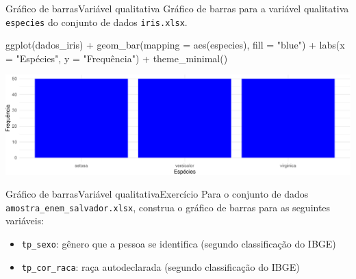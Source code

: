 \documentclass[
  10pt,
  ignorenonframetext,
]{beamer}
\newenvironment{Shaded}{}{}
\newcommand{\DataTypeTok}[1]{#1}
\newcommand{\KeywordTok}[1]{\textcolor[rgb]{0.00,0.00,1.00}{#1}}
\newcommand{\NormalTok}[1]{#1}
\newcommand{\OperatorTok}[1]{#1}
\newcommand{\StringTok}[1]{\textcolor[rgb]{0.00,0.50,0.50}{#1}}
\providecommand{\tightlist}{%
  \setlength{\itemsep}{0pt}\setlength{\parskip}{0pt}}
\begin{document}
\begin{frame}[fragile]{Gráfico de barras\newline Variável qualitativa}
\protect\hypertarget{gruxe1fico-de-barrasvariuxe1vel-qualitativa}{}
Gráfico de barras para a variável qualitativa \texttt{especies} do
conjunto de dados \texttt{iris.xlsx}.

\begin{Shaded}
\begin{Highlighting}[]
\KeywordTok{ggplot}\NormalTok{(dados\_iris) }\OperatorTok{+}
\StringTok{  }\KeywordTok{geom\_bar}\NormalTok{(}\DataTypeTok{mapping =} \KeywordTok{aes}\NormalTok{(especies), }\DataTypeTok{fill =} \StringTok{"blue"}\NormalTok{) }\OperatorTok{+}
\StringTok{  }\KeywordTok{labs}\NormalTok{(}\DataTypeTok{x =} \StringTok{"Espécies"}\NormalTok{, }\DataTypeTok{y =} \StringTok{"Frequência"}\NormalTok{) }\OperatorTok{+}
\StringTok{  }\KeywordTok{theme\_minimal}\NormalTok{()}
\end{Highlighting}
\end{Shaded}

\begin{center}\includegraphics[width=1\linewidth]{aulas_files/figure-beamer/unnamed-chunk-57-1} \end{center}
\end{frame}

\begin{frame}[fragile]{Gráfico de barras\newline Variável
qualitativa\newline Exercício}
\protect\hypertarget{gruxe1fico-de-barrasvariuxe1vel-qualitativaexercuxedcio}{}
Para o conjunto de dados \texttt{amostra\_enem\_salvador.xlsx}, construa
o gráfico de barras para as seguintes variáveis:

\begin{itemize}
\tightlist
\item
  \texttt{tp\_sexo}: gênero que a pessoa se identifica (segundo
  classificação do IBGE)
\item
  \texttt{tp\_cor\_raca}: raça autodeclarada (segundo classificação do
  IBGE)
\end{itemize}
\end{frame}
\end{document}
